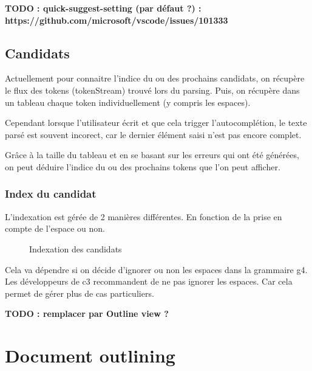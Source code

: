 \documentclass[
    iict, %
    il, %
]{heig-tb}
\begin{document}
\textbf{TODO : quick-suggest-setting (par défaut ?) : https://github.com/microsoft/vscode/issues/101333}


\subsection{Candidats}\label{candidates}

Actuellement pour connaitre l'indice du ou des prochains candidats, on récupère le flux des tokens (tokenStream) trouvé lors du parsing.
Puis, on récupère dans un tableau chaque token individuellement (y compris les espaces).

Cependant lorsque l'utilisateur écrit et que cela trigger l'autocomplétion, le texte parsé est souvent incorect, car le dernier élément saisi n'est pas encore complet.

Grâce à la taille du tableau et en se basant sur les erreurs qui ont été générées, on peut déduire l'indice du ou des prochains tokens que l'on peut afficher.

\subsubsection{Index du candidat}
L'indexation est gérée de 2 manières différentes. En fonction de la prise en compte de l'espace ou non.

\begin{figure}[!h]
    \begin{center}
    \end{center}
    \caption[Indexation des candidats]{\label{candidat-index} Indexation des candidats}
\end{figure}

Cela va dépendre si on décide d'ignorer ou non les espaces dans la grammaire g4.
Les développeurs de c3 recommandent de ne pas ignorer les espaces. Car cela permet de gérer plus de cas particuliers.

\textbf{TODO : remplacer par Outline view ?}
\section{Document outlining}
\end{document}
